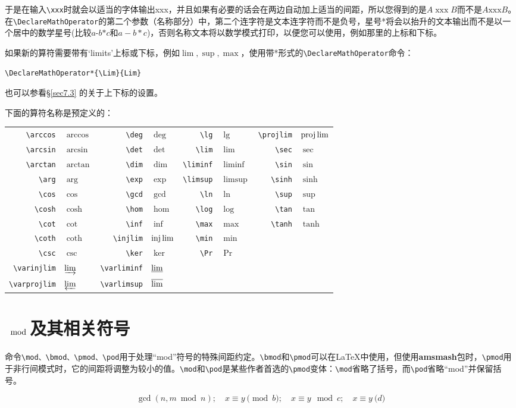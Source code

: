 \documentclass[openany]{ctexbook}
\DeclareMathOperator{\xxx}{xxx}
\begin{document}
于是在输入\verb|\xxx|时就会以适当的字体输出xxx，并且如果有必要的话会在两边自动加上适当的间距，所以您得到的是$A\xxx B$而不是$A\text{xxx}B$。在\verb|\DeclareMathOperator|的第二个参数（名称部分）中，第二个连字符是文本连字符而不是负号，星号*将会以抬升的文本输出而不是以一个居中的数学星号(比较$a\text{-}b\text{*}c$和$a-b*c$)，否则名称文本将以数学模式打印，以便您可以使用，例如那里的上标和下标。

如果新的算符需要带有`limits'上标或下标，例如$\lim,\sup,\max$，使用带*形式的\verb|\DeclareMathOperator|命令：
\begin{verbatim}
\DeclareMathOperator*{\Lim}{Lim}
\end{verbatim}
也可以参看\S \ref{sec7.3} 的关于上下标的设置。

下面的算符名称是预定义的：

\begin{tabular}{rlrlrlrl}
\verb|\arccos|&$\arccos$&\verb|\deg|&$\deg$&\verb|\lg|&$\lg$&\verb|\projlim|&$\projlim$\\
\verb|\arcsin|&$\arcsin$&\verb|\det|&$\det$&\verb|\lim|&$\lim$&\verb|\sec|&$\sec$\\
\verb|\arctan|&$\arctan$&\verb|\dim|&$\dim$&\verb|\liminf|&$\liminf$&\verb|\sin|&$\sin$\\
\verb|\arg|&$\arg$&\verb|\exp|&$\exp$&\verb|\limsup|&$\limsup$&\verb|\sinh|&$\sinh$\\
\verb|\cos|&$\cos$&\verb|\gcd|&$\gcd$&\verb|\ln|&$\ln$&\verb|\sup|&$\sup$\\
\verb|\cosh|&$\cosh$&\verb|\hom|&$\hom$&\verb|\log|&$\log$&\verb|\tan|&$\tan$\\
\verb|\cot|&$\cot$&\verb|\inf|&$\inf$&\verb|\max|&$\max$&\verb|\tanh|&$\tanh$\\
\verb|\coth|&$\coth$&\verb|\injlim|&$\injlim$&\verb|\min|&$\min$&&\\
\verb|\csc|&$\csc$&\verb|\ker|&$\ker$&\verb|\Pr|&$\Pr$&&\\
\verb|\varinjlim|&$\varinjlim$&\verb|\varliminf|&$\varliminf$&&&&\\
\verb|\varprojlim|&$\varprojlim$&\verb|\varlimsup|&$\varlimsup$&&&&
\end{tabular}

\section{$\mod$及其相关符号}
命令\verb|\mod、\bmod、\pmod、\pod|用于处理“mod”符号的特殊间距约定。\verb|\bmod|和\verb|\pmod|可以在\LaTeX 中使用，但使用{\bfseries amsmash}包时，\verb|\pmod|用于非行间模式时，它的间距将调整为较小的值。\verb|\mod|和\verb|\pod|是某些作者首选的\verb|\pmod|变体：\verb|\mod|省略了括号，而\verb|\pod|省略“mod”并保留括号。
\begin{tcblisting}{}
\begin{equation}
\gcd(n,m\bmod n);\quad x\equiv  y\pmod b;
\quad x\equiv y\mod c;\quad x\equiv y\pod d
\end{equation}
\end{tcblisting}
\end{document}
